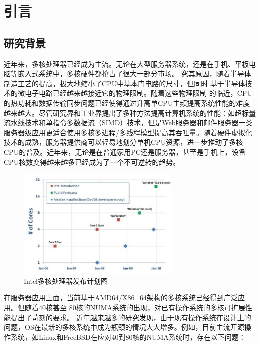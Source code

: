 

\chapter{引言}

\section{研究背景}

近年来，多核处理器已经成为主流。无论在大型服务器系统，还是在手机、平板电脑等嵌入式系统中，多核硬件都抢占了很大一部分市场。
究其原因，随着半导体制造工艺的提高，极大地缩小了CPU中基本门电路的尺寸，但同时
基于半导体技术的微电子电路已经越来越接近它的物理限制。随着这些物理限制
的临近，CPU的热功耗和数据传输同步问题已经使得通过升高单CPU主频提高系统性能的难度越来越大。尽管研究界和工业界提出了多种方法提高计算机系统的性能：如超标量流水线技术和单指令多数据流（SIMD）技术，但是Web服务器和邮件服务器一类服务器级应用更适合使用多核多进程/多线程模型提高其吞吐量。随着硬件虚拟化技术的成熟，服务器提供商可以轻易地划分单机CPU资源，进一步推动了多核CPU的普及。近年来，无论是在普通家用PC还是服务器，甚至是手机上，设备CPU核数变得越来越多已经成为了一个不可逆转的趋势。

\begin{figure}[ht]
\begin{center}
\includegraphics[width=0.7\textwidth]{figures/intro_roadmap.png}
\end{center}
\caption{Intel多核处理器发布计划图\protect\footnotemark}
\label{fig:intro_roadmap}
\end{figure}

在服务器应用上面，当前基于AMD64/X86\_64架构的多核系统已经得到广泛应用。但随着40核甚至
80核的NUMA系统的出现，对已有操作系统的多核可扩展性能提出了苛刻的要求。
近年越来越多的研究发现\cite{radixvm:eurosys13}，由于现有操作系统在设计上的问题，OS在最新的多核系统中成为瓶颈的情况大大增多。例如，目前主流开源操作系统，如Linux和FreeBSD在应对40到80核的NUMA系统时，存在以下问题：

